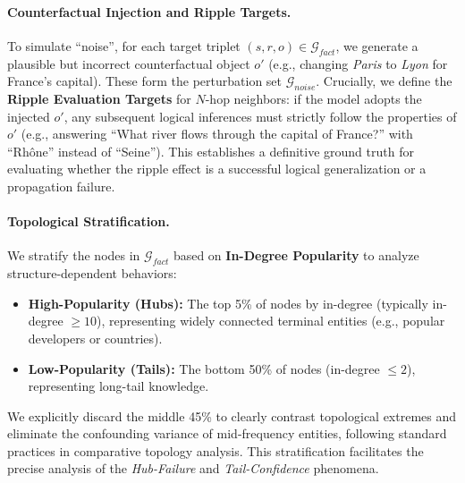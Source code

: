 \paragraph{Counterfactual Injection and Ripple Targets.}
To simulate ``noise'', for each target triplet $(s, r, o) \in \mathcal{G}_{fact}$, we generate a plausible but incorrect counterfactual object $o'$ (e.g., changing \textit{Paris} to \textit{Lyon} for France's capital). These form the perturbation set $\mathcal{G}_{noise}$. Crucially, we define the \textbf{Ripple Evaluation Targets} for $N$-hop neighbors: if the model adopts the injected $o'$, any subsequent logical inferences must strictly follow the properties of $o'$ (e.g., answering ``What river flows through the capital of France?'' with ``Rh\^one'' instead of ``Seine''). This establishes a definitive ground truth for evaluating whether the ripple effect is a successful logical generalization or a propagation failure.

\paragraph{Topological Stratification.}
We stratify the nodes in $\mathcal{G}_{fact}$ based on \textbf{In-Degree Popularity} to analyze structure-dependent behaviors:
\begin{itemize}
    \setlength\itemsep{0em} %
    \item \textbf{High-Popularity (Hubs):} The top 5\% of nodes by in-degree (typically in-degree $\ge 10$), representing widely connected terminal entities (e.g., popular developers or countries).
    \item \textbf{Low-Popularity (Tails):} The bottom 50\% of nodes (in-degree $\le 2$), representing long-tail knowledge.
\end{itemize}
We explicitly discard the middle 45\% to clearly contrast topological extremes and eliminate the confounding variance of mid-frequency entities, following standard practices in comparative topology analysis. This stratification facilitates the precise analysis of the \textit{Hub-Failure} and \textit{Tail-Confidence} phenomena.